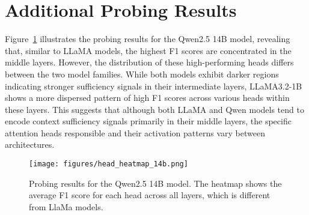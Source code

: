 
\section{Additional Probing Results}
\label{app:probe}


Figure~\ref{fig:confidence_trends} illustrates the probing results for the Qwen2.5 14B model, revealing that, similar to LLaMA models, the highest F1 scores are concentrated in the middle layers. However, the distribution of these high-performing heads differs between the two model families. While both models exhibit darker regions indicating stronger sufficiency signals in their intermediate layers, LLaMA3.2-1B shows a more dispersed pattern of high F1 scores across various heads within these layers. This suggests that although both LLaMA and Qwen models tend to encode context sufficiency signals primarily in their middle layers, the specific attention heads responsible and their activation patterns vary between architectures.

\begin{figure}[ht!]
    \centering
    \texttt{[image: figures/head\_heatmap\_14b.png]}
    \caption{Probing results for the Qwen2.5 14B model. The heatmap shows the average F1 score for each head across all layers, which is different from LlaMa models.}
    \label{fig:confidence_trends}
    \end{figure}
    